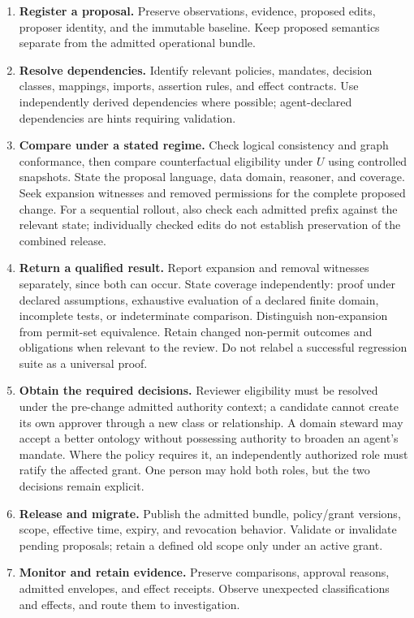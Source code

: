 \documentclass[
  english,
  12pt,
  a4paper,
  preprint,
  numbers,
  nopreprintline]{elsarticle}
\providecommand{\tightlist}{%
  \setlength{\itemsep}{0pt}\setlength{\parskip}{0pt}}
\begin{document}
\begin{enumerate}
\def\labelenumi{\arabic{enumi}.}
\tightlist
\item
  \textbf{Register a proposal.} Preserve observations, evidence,
  proposed edits, proposer identity, and the immutable baseline. Keep
  proposed semantics separate from the admitted operational bundle.
\item
  \textbf{Resolve dependencies.} Identify relevant policies, mandates,
  decision classes, mappings, imports, assertion rules, and effect
  contracts. Use independently derived dependencies where possible;
  agent-declared dependencies are hints requiring validation.
\item
  \textbf{Compare under a stated regime.} Check logical consistency and
  graph conformance, then compare counterfactual eligibility under \(U\)
  using controlled snapshots. State the proposal language, data domain,
  reasoner, and coverage. Seek expansion witnesses and removed
  permissions for the complete proposed change. For a sequential
  rollout, also check each admitted prefix against the relevant state;
  individually checked edits do not establish preservation of the
  combined release.
\item
  \textbf{Return a qualified result.} Report expansion and removal
  witnesses separately, since both can occur. State coverage
  independently: proof under declared assumptions, exhaustive evaluation
  of a declared finite domain, incomplete tests, or indeterminate
  comparison. Distinguish non-expansion from permit-set equivalence.
  Retain changed non-permit outcomes and obligations when relevant to
  the review. Do not relabel a successful regression suite as a
  universal proof.
\item
  \textbf{Obtain the required decisions.} Reviewer eligibility must be
  resolved under the pre-change admitted authority context; a candidate
  cannot create its own approver through a new class or relationship. A
  domain steward may accept a better ontology without possessing
  authority to broaden an agent's mandate. Where the policy requires it,
  an independently authorized role must ratify the affected grant. One
  person may hold both roles, but the two decisions remain explicit.
\item
  \textbf{Release and migrate.} Publish the admitted bundle,
  policy/grant versions, scope, effective time, expiry, and revocation
  behavior. Validate or invalidate pending proposals; retain a defined
  old scope only under an active grant.
\item
  \textbf{Monitor and retain evidence.} Preserve comparisons, approval
  reasons, admitted envelopes, and effect receipts. Observe unexpected
  classifications and effects, and route them to investigation.
\end{enumerate}
\end{document}
